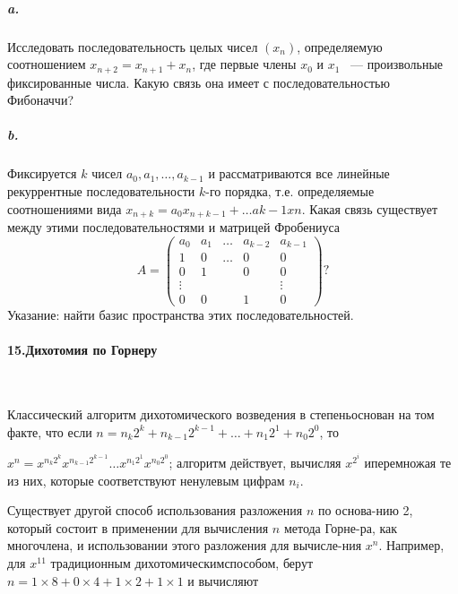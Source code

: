 \documentclass{mai_book}
\begin{document}
\subparagraph { a.} Исследовать последовательность целых чисел $\left({x_{n}}\right)$, определяемую соотношением $x_{n+2}=x_{n+1}+x_{n}$, где первые члены $x_{0}$ и $x_{1}$ ~--- произвольные фиксированные числа. Какую связь она имеет с последовательностью Фибоначчи? 
\subparagraph { b.} Фиксируется $k$ чисел $a_{0},a_{1},\dots, a_{k-1}$ и рассматриваются все линейные рекуррентные последовательности $k$-го порядка, т.е. определяемые соотношениями вида $x_{n+k}=a_{0}x_{n+k-1}+\dots a{k-1}x{n}$. Какая связь существует между этими последовательностями и матрицей Фробениуса
$$A= \begin{pmatrix} 
a_{0} & a_{1}&\dots    & a_{k-2}& a_{k-1} \\ 
1         & 0        & \dots  & 0           & 0\\
 0        & 1        & {}      & 0           & 0 \\
\vdots & {}      & {}      & {}          & \vdots \\
0         & 0        & {}      & 1           & 0
\end{pmatrix}?$$
Указание: найти базис пространства этих последовательностей.

\paragraph { 15.Дихотомия по Горнеру }\ \newline

Классический алгоритм дихотомического возведения в степень\linebreak основан на\: том\: факте, что\: если\: $n=n_{k}2^{k}+ n_{k-1}2^{k-1}+ \dots + n_{1}2^{1}+ n_{0}2^{0}$,\: то
\newpage
	

\noindent $x^{n}=x^{n_{k}2^{k}} x^{n_{k-1}2^{k-1}} \dots x^{n_{1}2^{1}} x^{n_{0}2^{0}}$; алгоритм действует, вычисляя  $x^{2^{i}}$ и\linebreak перемножая те из них, которые соответствуют ненулевым цифрам $n_{i}$. 

Существует другой способ использования разложения $n$ по основа-\linebreak нию 2, который состоит в применении для вычисления $n$ метода Горне-\linebreak ра, как многочлена, и использовании этого разложения для вычисле-\linebreak ния $x^{n}$. Например, для $x^{11}$ традиционным дихотомическим\linebreak способом, берут $ n=1\times{8}+0\times{4}+1\times{2}+1\times{1}$ и вычисляют 
\end{document}
